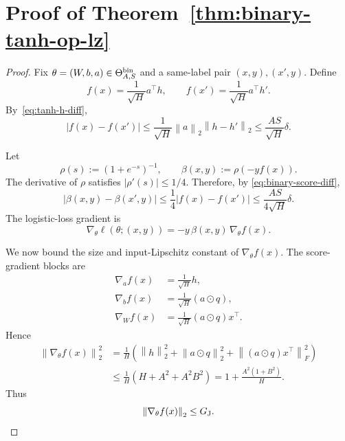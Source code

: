 \documentclass[11pt,a4paper]{report}
\theoremstyle{plain}
\theoremstyle{definition}
\theoremstyle{remark}
\newcommand{\norm}[1]{\left\lVert #1\right\rVert}
\begin{document}
\section{Proof of Theorem~\ref{thm:binary-tanh-op-lz}}
\label{app:binary-tanh-proof}

\begin{proof}
Fix $\theta=(W,b,a)\in\Theta_{A,S}^{\rm bin}$ and a same-label pair
$(x,y),(x',y)$.  Define
\[
f(x)=\frac1{\sqrt H}a^\top h,
\qquad
f(x')=\frac1{\sqrt H}a^\top h'.
\]
By~\eqref{eq:tanh-h-diff},
\begin{equation}
\label{eq:binary-score-diff}
|f(x)-f(x')|
\le
\frac1{\sqrt H}\norm{a}_2\norm{h-h'}_2
\le
\frac{AS}{\sqrt H}\delta.
\end{equation}

Let
\[
\rho(s):=(1+e^{-s})^{-1},
\qquad
\beta(x,y):=\rho(-yf(x)).
\]
The derivative of $\rho$ satisfies $|\rho'(s)|\le1/4$.  Therefore, by
\eqref{eq:binary-score-diff},
\begin{equation}
\label{eq:binary-beta-diff}
|\beta(x,y)-\beta(x',y)|
\le
\frac14|f(x)-f(x')|
\le
\frac{AS}{4\sqrt H}\delta.
\end{equation}
The logistic-loss gradient is
\begin{equation}
\label{eq:binary-loss-gradient-factorization}
\nabla_\theta\ell(\theta;(x,y))
=
-y\,\beta(x,y)\,\nabla_\theta f(x).
\end{equation}

We now bound the size and input-Lipschitz constant of $\nabla_\theta f(x)$.
The score-gradient blocks are
\begin{align*}
\nabla_a f(x)&=\frac1{\sqrt H}h,\\
\nabla_b f(x)&=\frac1{\sqrt H}(a\odot q),\\
\nabla_W f(x)&=\frac1{\sqrt H}(a\odot q)x^\top.
\end{align*}
Hence
\begin{align*}
\norm{\nabla_\theta f(x)}_2^2
&=
\frac1H\left(
\norm{h}_2^2+
\norm{a\odot q}_2^2+
\norm{(a\odot q)x^\top}_F^2
\right)\\
&\le
\frac1H\left(H+A^2+A^2B^2\right)
=
1+\frac{A^2(1+B^2)}H.
\end{align*}
Thus
\begin{equation}
\label{eq:binary-GJ-bound}
\norm{\nabla_\theta f(x)}_2\le G_{\rm J}.
\end{equation}


\end{proof}
\end{document}
